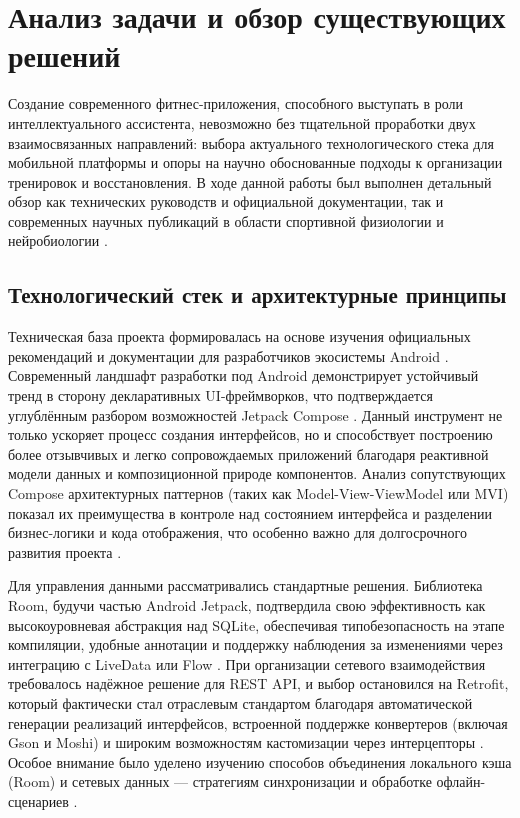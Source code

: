 \section{Анализ задачи и обзор существующих решений}

Создание современного фитнес-приложения, способного выступать в роли интеллектуального ассистента, невозможно без тщательной проработки двух взаимосвязанных направлений: выбора актуального технологического стека для мобильной платформы и опоры на научно обоснованные подходы к организации тренировок и восстановления. В ходе данной работы был выполнен детальный обзор как технических руководств и официальной документации, так и современных научных публикаций в области спортивной физиологии и нейробиологии \cite{refa,refb}.

\subsection{Технологический стек и архитектурные принципы}

Техническая база проекта формировалась на основе изучения официальных рекомендаций и документации для разработчиков экосистемы Android \cite{refc}. Современный ландшафт разработки под Android демонстрирует устойчивый тренд в сторону декларативных UI-фреймворков, что подтверждается углублённым разбором возможностей Jetpack Compose \cite{refd}. Данный инструмент не только ускоряет процесс создания интерфейсов, но и способствует построению более отзывчивых и легко сопровождаемых приложений благодаря реактивной модели данных и композиционной природе компонентов. Анализ сопутствующих Compose архитектурных паттернов (таких как Model-View-ViewModel или MVI) показал их преимущества в контроле над состоянием интерфейса и разделении бизнес-логики и кода отображения, что особенно важно для долгосрочного развития проекта \cite{refe}.

Для управления данными рассматривались стандартные решения. Библиотека Room, будучи частью Android Jetpack, подтвердила свою эффективность как высокоуровневая абстракция над SQLite, обеспечивая типобезопасность на этапе компиляции, удобные аннотации и поддержку наблюдения за изменениями через интеграцию с LiveData или Flow \cite{reff}. При организации сетевого взаимодействия требовалось надёжное решение для REST API, и выбор остановился на Retrofit, который фактически стал отраслевым стандартом благодаря автоматической генерации реализаций интерфейсов, встроенной поддержке конвертеров (включая Gson и Moshi) и широким возможностям кастомизации через интерцепторы \cite{refg}. Особое внимание было уделено изучению способов объединения локального кэша (Room) и сетевых данных — стратегиям синхронизации и обработке офлайн-сценариев \cite{refh}.

